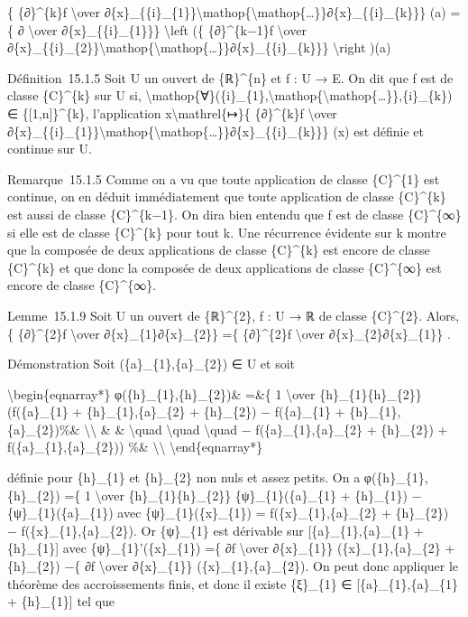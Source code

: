 \{ \{∂\}\^{}\{k\}f \textbackslash{}over
∂\{x\}\_\{\{i\}\_\{1\}\}\textbackslash{}mathop\{\textbackslash{}mathop\{\ldots{}\}\}∂\{x\}\_\{\{i\}\_\{k\}\}\}
(a) =\{ ∂ \textbackslash{}over ∂\{x\}\_\{\{i\}\_\{1\}\}\}
\textbackslash{}left (\{ \{∂\}\^{}\{k−1\}f \textbackslash{}over
∂\{x\}\_\{\{i\}\_\{2\}\}\textbackslash{}mathop\{\textbackslash{}mathop\{\ldots{}\}\}∂\{x\}\_\{\{i\}\_\{k\}\}\}
\textbackslash{}right )(a)

Définition~15.1.5 Soit U un ouvert de \{ℝ\}\^{}\{n\} et f : U → E. On
dit que f est de classe \{C\}\^{}\{k\} sur U si,
\textbackslash{}mathop\{∀\}(\{i\}\_\{1\},\textbackslash{}mathop\{\textbackslash{}mathop\{\ldots{}\}\},\{i\}\_\{k\})
∈ \{{[}1,n{]}\}\^{}\{k\}, l'application x\textbackslash{}mathrel\{↦\}\{
\{∂\}\^{}\{k\}f \textbackslash{}over
∂\{x\}\_\{\{i\}\_\{1\}\}\textbackslash{}mathop\{\textbackslash{}mathop\{\ldots{}\}\}∂\{x\}\_\{\{i\}\_\{k\}\}\}
(x) est définie et continue sur U.

Remarque~15.1.5 Comme on a vu que toute application de classe
\{C\}\^{}\{1\} est continue, on en déduit immédiatement que toute
application de classe \{C\}\^{}\{k\} est aussi de classe
\{C\}\^{}\{k−1\}. On dira bien entendu que f est de classe
\{C\}\^{}\{∞\} si elle est de classe \{C\}\^{}\{k\} pour tout k. Une
récurrence évidente sur k montre que la composée de deux applications de
classe \{C\}\^{}\{k\} est encore de classe \{C\}\^{}\{k\} et que donc la
composée de deux applications de classe \{C\}\^{}\{∞\} est encore de
classe \{C\}\^{}\{∞\}.

Lemme~15.1.9 Soit U un ouvert de \{ℝ\}\^{}\{2\}, f : U → ℝ de classe
\{C\}\^{}\{2\}. Alors, \{ \{∂\}\^{}\{2\}f \textbackslash{}over
∂\{x\}\_\{1\}∂\{x\}\_\{2\}\} =\{ \{∂\}\^{}\{2\}f \textbackslash{}over
∂\{x\}\_\{2\}∂\{x\}\_\{1\}\} .

Démonstration Soit (\{a\}\_\{1\},\{a\}\_\{2\}) ∈ U et soit

\textbackslash{}begin\{eqnarray*\} φ(\{h\}\_\{1\},\{h\}\_\{2\})\& =\&\{
1 \textbackslash{}over \{h\}\_\{1\}\{h\}\_\{2\}\} (f(\{a\}\_\{1\} +
\{h\}\_\{1\},\{a\}\_\{2\} + \{h\}\_\{2\}) − f(\{a\}\_\{1\} +
\{h\}\_\{1\},\{a\}\_\{2\})\%\& \textbackslash{}\textbackslash{} \& \&
\textbackslash{}quad \textbackslash{}quad \textbackslash{}quad −
f(\{a\}\_\{1\},\{a\}\_\{2\} + \{h\}\_\{2\}) +
f(\{a\}\_\{1\},\{a\}\_\{2\})) \%\& \textbackslash{}\textbackslash{}
\textbackslash{}end\{eqnarray*\}

définie pour \{h\}\_\{1\} et \{h\}\_\{2\} non nuls et assez petits. On a
φ(\{h\}\_\{1\},\{h\}\_\{2\}) =\{ 1 \textbackslash{}over
\{h\}\_\{1\}\{h\}\_\{2\}\} \{ψ\}\_\{1\}(\{a\}\_\{1\} + \{h\}\_\{1\}) −
\{ψ\}\_\{1\}(\{a\}\_\{1\}) avec \{ψ\}\_\{1\}(\{x\}\_\{1\}) =
f(\{x\}\_\{1\},\{a\}\_\{2\} + \{h\}\_\{2\}) −
f(\{x\}\_\{1\},\{a\}\_\{2\}). Or \{ψ\}\_\{1\} est dérivable sur
{[}\{a\}\_\{1\},\{a\}\_\{1\} + \{h\}\_\{1\}{]} avec
\{ψ\}\_\{1\}'(\{x\}\_\{1\}) =\{ ∂f \textbackslash{}over ∂\{x\}\_\{1\}\}
(\{x\}\_\{1\},\{a\}\_\{2\} + \{h\}\_\{2\}) −\{ ∂f \textbackslash{}over
∂\{x\}\_\{1\}\} (\{x\}\_\{1\},\{a\}\_\{2\}). On peut donc appliquer le
théorème des accroissements finis, et donc il existe \{ξ\}\_\{1\} ∈
{[}\{a\}\_\{1\},\{a\}\_\{1\} + \{h\}\_\{1\}{]} tel que

